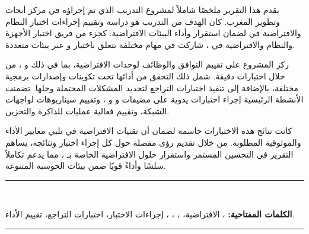 
\begin{RLtext}

    يقدم هذا التقرير ملخصًا شاملاً لمشروع التدريب الذي تم إجراؤه في مركز أبحاث وتطوير  المغرب. كان الهدف من التدريب هو دراسة وتقييم إجراءات اختبار النظام والافتراضية في  لضمان استقرار وأداء البيئات الافتراضية. كجزء من فريق اختبار الأجهزة والنظام والافتراضية في ، شاركت في مهام مختلفة تتعلق باختبار  و  عبر بيئات  متعددة.

    ركز المشروع على تقييم التوافق والوظائف لوحدات الافتراضية، بما في ذلك  و ، من خلال اختبارات دقيقة. شمل ذلك التحقق من أدائها تحت تكوينات وإصدارات برمجية مختلفة، بالإضافة إلى تنفيذ اختبارات التراجع لتحديد المشكلات المحتملة وحلها. تضمنت الأنشطة الرئيسية إجراء اختبارات يدوية على مضيفات و و ، وتقييم سيناريوهات  لواجهات الشبكة، وتقييم فعالية عمليات  للذاكرة والتخزين.
    
    كانت نتائج هذه الاختبارات حاسمة لضمان أن تقنيات الافتراضية في  تلبي معايير الأداء والموثوقية المطلوبة. من خلال تقديم رؤى مفصلة حول كل إجراء اختبار ونتائجه، يساهم التقرير في التحسين المستمر واستقرار حلول الافتراضية الخاصة بـ ، مما يدعم تكاملاً سلسًا وأداءً قويًا ضمن بيئات الحوسبة المتنوعة.
    \bigskip
\end{RLtext}

\noindent\rule{\linewidth}{0.3mm} \\[0.6cm] 
\begin{RLtext}
    \textbf{الكلمات المفتاحية:} ، الافتراضية، ، ، ، إجراءات الاختبار، اختبارات التراجع، تقييم الأداء.
\end{RLtext}

\noindent\rule{\linewidth}{0.3mm} \\[0.6cm]